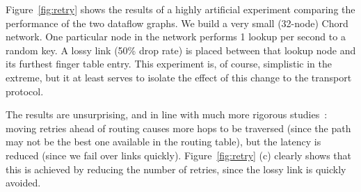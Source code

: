 
Figure~\ref{fig:retry} shows the results of a highly artificial
experiment comparing the performance of the two dataflow graphs.  We
build a very small (32-node) Chord network.  One 
particular node in the network performs 1 lookup per second to a
random key.  A lossy link (50\% drop rate) is placed between that lookup node and its
furthest finger table entry.
This experiment is, of course, simplistic in the extreme, but it
at least serves to isolate the effect of this change to the transport
protocol.

The results are unsurprising, and in line with much more rigorous
studies~\cite{rhea_usenix_2004,dabek_nsdi04}: moving retries ahead of
routing causes more hops to be traversed (since the path may not be
the best one available in the routing table), but the latency is
reduced (since we fail over links quickly).  Figure~\ref{fig:retry}
(c) clearly shows that this is achieved by reducing the number of
retries, since the lossy link is quickly avoided. 


